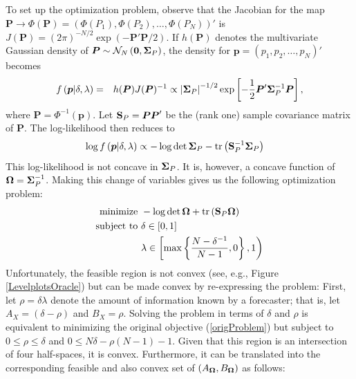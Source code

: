 \documentclass[12pt]{article}
\DeclareMathOperator{\tr}{tr}
\theoremstyle{definition}
\theoremstyle{definition}
\begin{document}
To set up the optimization problem, observe that the Jacobian for the map $\boldsymbol{P} \to \Phi\left(\boldsymbol{P}\right) = (\Phi(P_1), \Phi(P_2), \dots, \Phi(P_N))'$ is $J(\boldsymbol{P}) = (2\pi)^{-N/2} \exp \left( - \boldsymbol{P}' \boldsymbol{P}/2  \right)$. If $h(\boldsymbol{P})$ denotes the multivariate Gaussian density of $\boldsymbol{P} \sim \mathcal{N}_N\left(\boldsymbol{0}, {\bf\Sigma}_{P}\right)$,
the density for  $\boldsymbol{p} = (p_1, p_2, \dots, p_N)'$ becomes
\begin{eqnarray*}
 f\left(\boldsymbol{p} | \delta, \lambda \right) &=& h(\boldsymbol{P}) J(\boldsymbol{P})^{-1}
\propto \left|{\bf\Sigma}_{P}\right|^{-1/2} \exp\left[ -\frac{1}{2} \boldsymbol{P}' {\bf\Sigma}_{P}^{-1} \boldsymbol{P}  \right],
\end{eqnarray*}
where $\boldsymbol{P} = \Phi^{-1}(\boldsymbol{p})$. Let  ${\bf S}_P = \boldsymbol{P}\boldsymbol{P}'$ be the (rank one) sample covariance matrix of $\boldsymbol{P}$. The log-likelihood then reduces to
\begin{align*}
\log  f\left(\boldsymbol{p} | \delta, \lambda \right) &\propto -\log \det {\bf\Sigma}_P - \tr\left({\bf S}_P^{-1} {\bf\Sigma}_P \right) 
\end{align*}
This log-likelihood is not concave in ${\bf\Sigma}_P$.  It is, however, a concave function of ${\bf\Omega} = {\bf\Sigma}_P^{-1}$. Making this change of variables gives us the following optimization problem:
\begin{align}
\text{minimize } & -\log \det {\bf\Omega} + \tr\left({\bf S}_P {\bf\Omega} \right) \label{origProblem} \\
 \text{subject to } & \nonumber \delta \in [0,1] \nonumber \\
 & \lambda \in \left[  \max \left\{ \frac{N-\delta^{-1}}{N-1}, 0\right\}, 1 \right) \nonumber
\end{align}
Unfortunately, the feasible region is not convex (see, e.g., Figure \ref{LevelplotsOracle}) but can be made convex by re-expressing the problem: First, let $\rho = \delta\lambda$ denote the amount of information known by a forecaster; that is, let $A_X = (\delta - \rho)$ and $B_X = \rho$. Solving the problem in terms of $\delta$ and $\rho$ is equivalent to minimizing the original objective (\ref{origProblem}) but subject to $0 \leq \rho \leq \delta$ and $0 \leq N \delta -\rho(N-1)-1$. Given that this region is an intersection of four half-spaces, it is convex. Furthermore, it can be translated into the corresponding feasible and also convex set of $(A_{\bf\Omega}, B_{\bf\Omega})$ as follows: 
\end{document}
